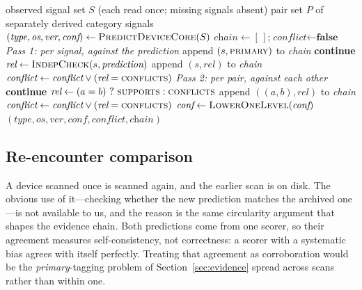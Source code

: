 \documentclass[conference]{IEEEtran}
\begin{document}
\begin{algorithm}[t]
\footnotesize
\caption{Prediction with a separate evidence chain}
\label{alg:chain}
\begin{algorithmic}[1]
\Require observed signal set $S$ (each read once; missing signals absent)
\Require pair set $P$ of separately derived category signals
\State $(\textit{type}, \textit{os}, \textit{ver}, \textit{conf}) \gets
        \Call{PredictDeviceCore}{S}$ 
\State $\textit{chain} \gets [\,]$;\quad $\textit{conflict} \gets \textbf{false}$
\Statex \textit{Pass 1: per signal, against the prediction}
     \State append $(s,\textsc{primary})$ to \textit{chain}
     \State \textbf{continue}
  \EndIf
  \State $\textit{rel} \gets \Call{IndepCheck}{s, \textit{prediction}}$
  \State append $(s,\textit{rel})$ to \textit{chain}
  \State $\textit{conflict} \gets \textit{conflict} \lor
         (\textit{rel} = \textsc{conflicts})$
\EndFor
\Statex \textit{Pass 2: per pair, against each other}
     \State \textbf{continue} 
  \EndIf
  \State $\textit{rel} \gets (a = b)\ ?\ \textsc{supports} : \textsc{conflicts}$
  \State append $((a,b),\textit{rel})$ to \textit{chain}
  \State $\textit{conflict} \gets \textit{conflict} \lor
         (\textit{rel} = \textsc{conflicts})$
\EndFor
{}
  \State $\textit{conf} \gets \Call{LowerOneLevel}{\textit{conf}}$
\EndIf
\State \Return $(\textit{type}, \textit{os}, \textit{ver}, \textit{conf},
        \textit{conflict}, \textit{chain})$
\end{algorithmic}
\end{algorithm}

\subsection{Re-encounter comparison}\label{sec:reencounter}
A device scanned once is scanned again, and the earlier scan is on disk. The
obvious use of it---checking whether the new prediction matches the archived
one---is not available to us, and the reason is the same circularity argument
that shapes the evidence chain. Both predictions come from one scorer, so
their agreement measures self-consistency, not correctness: a scorer with a
systematic bias agrees with itself perfectly. Treating that agreement as
corroboration would be the \emph{primary}-tagging problem of
Section~\ref{sec:evidence} spread across scans rather than within one.
\end{document}
